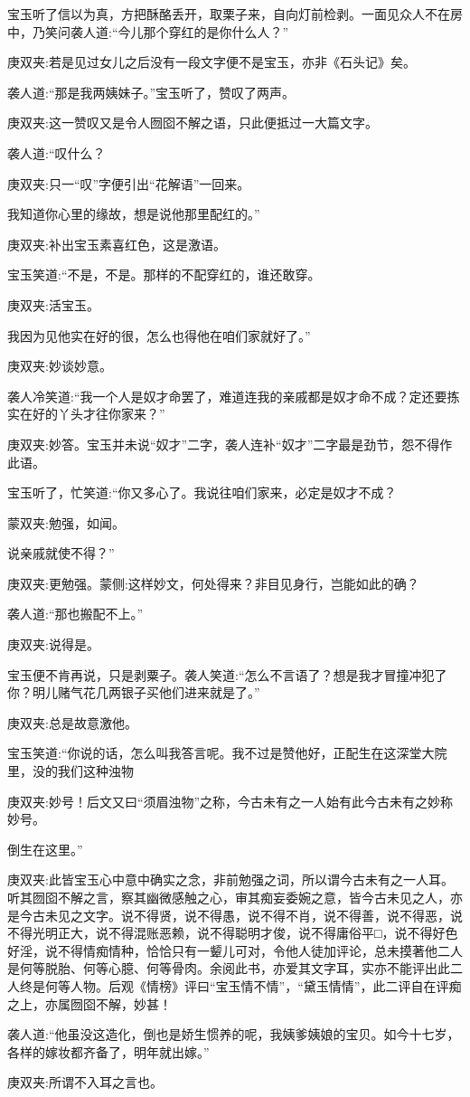 \begin{parag}
    宝玉听了信以为真，方把酥酪丢开，取栗子来，自向灯前检剥。一面见众人不在房中，乃笑问袭人道:“今儿那个穿红的是你什么人？”\begin{note}庚双夹:若是见过女儿之后没有一段文字便不是宝玉，亦非《石头记》矣。\end{note}袭人道:“那是我两姨妹子。”宝玉听了，赞叹了两声。\begin{note}庚双夹:这一赞叹又是令人囫囵不解之语，只此便抵过一大篇文字。\end{note}袭人道:“叹什么？\begin{note}庚双夹:只一“叹”字便引出“花解语”一回来。\end{note}我知道你心里的缘故，想是说他那里配红的。”\begin{note}庚双夹:补出宝玉素喜红色，这是激语。\end{note}宝玉笑道:“不是，不是。那样的不配穿红的，谁还敢穿。\begin{note}庚双夹:活宝玉。\end{note}我因为见他实在好的很，怎么也得他在咱们家就好了。”\begin{note}庚双夹:妙谈妙意。\end{note}袭人冷笑道:“我一个人是奴才命罢了，难道连我的亲戚都是奴才命不成？定还要拣实在好的丫头才往你家来？”\begin{note}庚双夹:妙答。宝玉并未说“奴才”二字，袭人连补“奴才”二字最是劲节，怨不得作此语。\end{note}宝玉听了，忙笑道:“你又多心了。我说往咱们家来，必定是奴才不成？\begin{note}蒙双夹:勉强，如闻。\end{note}说亲戚就使不得？”\begin{note}庚双夹:更勉强。蒙侧:这样妙文，何处得来？非目见身行，岂能如此的确？\end{note}袭人道:“那也搬配不上。”\begin{note}庚双夹:说得是。\end{note}宝玉便不肯再说，只是剥粟子。袭人笑道:“怎么不言语了？想是我才冒撞冲犯了你？明儿赌气花几两银子买他们进来就是了。”\begin{note}庚双夹:总是故意激他。\end{note}宝玉笑道:“你说的话，怎么叫我答言呢。我不过是赞他好，正配生在这深堂大院里，没的我们这种浊物\begin{note}庚双夹:妙号！后文又曰“须眉浊物”之称，今古未有之一人始有此今古未有之妙称妙号。\end{note}倒生在这里。”\begin{note}庚双夹:此皆宝玉心中意中确实之念，非前勉强之词，所以谓今古未有之一人耳。听其囫囵不解之言，察其幽微感触之心，审其痴妄委婉之意，皆今古未见之人，亦是今古未见之文字。说不得贤，说不得愚，说不得不肖，说不得善，说不得恶，说不得光明正大，说不得混账恶赖，说不得聪明才俊，说不得庸俗平□，说不得好色好淫，说不得情痴情种，恰恰只有一颦儿可对，令他人徒加评论，总未摸著他二人是何等脱胎、何等心臆、何等骨肉。余阅此书，亦爱其文字耳，实亦不能评出此二人终是何等人物。后观《情榜》评曰“宝玉情不情”，“黛玉情情”，此二评自在评痴之上，亦属囫囵不解，妙甚！\end{note}袭人道:“他虽没这造化，倒也是娇生惯养的呢，我姨爹姨娘的宝贝。如今十七岁，各样的嫁妆都齐备了，明年就出嫁。”\begin{note}庚双夹:所谓不入耳之言也。\end{note}

\end{parag}
